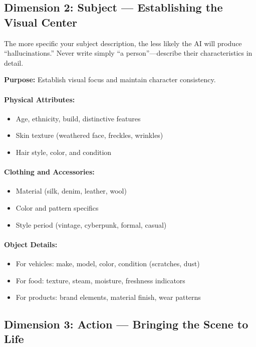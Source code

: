 \subsection{Dimension 2: Subject --- Establishing the Visual Center}
\label{subsec:dim-subject}

The more specific your subject description, the less likely the AI will produce ``hallucinations.'' Never write simply ``a person''---describe their characteristics in detail.

\textbf{Purpose:} Establish visual focus and maintain character consistency.

\paragraph{Physical Attributes:}
\begin{itemize}
    \item Age, ethnicity, build, distinctive features
    \item Skin texture (weathered face, freckles, wrinkles)
    \item Hair style, color, and condition
\end{itemize}

\paragraph{Clothing and Accessories:}
\begin{itemize}
    \item Material (silk, denim, leather, wool)
    \item Color and pattern specifics
    \item Style period (vintage, cyberpunk, formal, casual)
\end{itemize}

\paragraph{Object Details:}
\begin{itemize}
    \item For vehicles: make, model, color, condition (scratches, dust)
    \item For food: texture, steam, moisture, freshness indicators
    \item For products: brand elements, material finish, wear patterns
\end{itemize}

\subsection{Dimension 3: Action --- Bringing the Scene to Life}
\label{subsec:dim-action}

